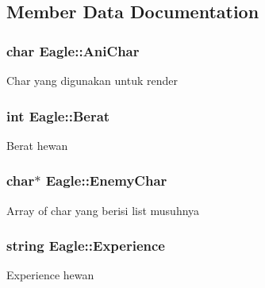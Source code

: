 \subsection{Member Data Documentation}
\subsubsection[{\texorpdfstring{Ani\+Char}{AniChar}}]{\setlength{\rightskip}{0pt plus 5cm}char Eagle\+::\+Ani\+Char\hspace{0.3cm}{\ttfamily [protected]}}\hypertarget{class_eagle_a51848217dd4b104fde6fdcfc56b747b8}{}\label{class_eagle_a51848217dd4b104fde6fdcfc56b747b8}
Char yang digunakan untuk render 
\subsubsection[{\texorpdfstring{Berat}{Berat}}]{\setlength{\rightskip}{0pt plus 5cm}int Eagle\+::\+Berat\hspace{0.3cm}{\ttfamily [protected]}}\hypertarget{class_eagle_ad67052387c7a14e70884eb64543371e6}{}\label{class_eagle_ad67052387c7a14e70884eb64543371e6}
Berat hewan 
\subsubsection[{\texorpdfstring{Enemy\+Char}{EnemyChar}}]{\setlength{\rightskip}{0pt plus 5cm}char$\ast$ Eagle\+::\+Enemy\+Char\hspace{0.3cm}{\ttfamily [protected]}}\hypertarget{class_eagle_aa022a6488691235bca90587719675ebc}{}\label{class_eagle_aa022a6488691235bca90587719675ebc}
Array of char yang berisi list musuhnya 
\subsubsection[{\texorpdfstring{Experience}{Experience}}]{\setlength{\rightskip}{0pt plus 5cm}string Eagle\+::\+Experience\hspace{0.3cm}{\ttfamily [protected]}}\hypertarget{class_eagle_aa0cc19789f81ee5816af9bdcdb317c95}{}\label{class_eagle_aa0cc19789f81ee5816af9bdcdb317c95}
Experience hewan 
